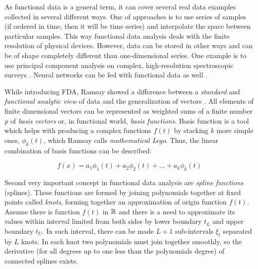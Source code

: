 \documentclass[energies,article,submit,pdftex,moreauthors]{Definitions/mdpi}
\begin{document}
As functional data is a general term, it can cover several real data examples collected in several different ways. One of approaches is to use series of samples (if ordered in time, then it will be time series) and interpolate the space between particular samples. This way functional data analysis deals with the finite resolution of physical devices. However, data can be stored in other ways and can be of shape completely different than one-dimensional series. One example is to use principal component analysis on complex, high-resolution spectroscopic surveys \cite{Patil_2022}. Neural networks can be fed with functional data as well \cite{rossi2005representation}.

While introducing FDA, Ramsay showed a difference between a \emph{standard} and \emph{functional analytic view} of data and the generalization of vectors \cite{ramsay1982data}. All elements of finite dimensional vectors can be represented as weighted sums of a finite number \emph{p} of \emph{basis vectors} or, in functional world, \emph{basis functions}. Basis function is a tool which helps with producing a complex functions $ f(t) $ by stacking $ k $ more simple ones, $ \phi_k(t) $, which Ramsay calls \emph{mathematical Lego}. Thus, the linear combination of basis functions can be described:

\begin{linenomath}
\begin{equation}
f(x) = a_1 \phi_1(t) + a_2 \phi_2(t) + ... + a_k \phi_k(t)
\end{equation}
\end{linenomath}

Second very important concept in functional data analysis are \emph{spline functions} (splines). These functions are formed by joining polynomials together at fixed points called \emph{knots}, forming together an approximation of origin function $ f(t) $. Assume there is function $ f(t) $ in $ {\Bbb R} $ and there is a need to approximate its values within interval limited from both sides by lower boundary $ t_L $ and upper boundary $ t_U $. In such interval, there can be made $ L+1 $ sub-intervals $ \xi_l $ separated by $ L $ knots. In each knot two polynomials must join together smoothly, so the derivative (for all degrees up to one less than the polynomials degree) of connected splines exists.
\end{document}
